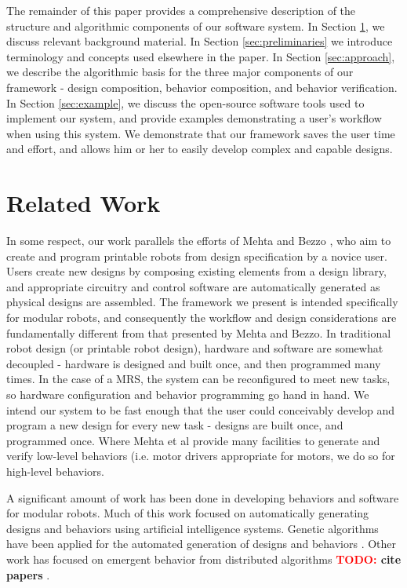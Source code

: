 \documentclass[conference]{IEEEtran}
\theoremstyle{definition}
\newcommand{\TODO}[1]{ {\bf \textcolor{red}{TODO:} #1 }}
\begin{document}
The remainder of this paper provides a comprehensive description of the
structure and algorithmic components of our software system.  In Section \ref{sec:related-work},
we discuss relevant background material.
In Section \ref{sec:preliminaries} we introduce terminology and  concepts used elsewhere in the
paper. 
In Section \ref{sec:approach}, we describe the algorithmic basis
for the three major components of our framework - design composition, behavior
composition, and behavior verification.  In Section
\ref{sec:example}, we discuss the open-source software
tools used to implement our system, and provide examples demonstrating a user's
workflow when using this system.  We demonstrate that our framework saves the
user time and effort, and allows him or her to easily develop complex and
capable designs.


\section{Related Work}
\label{sec:related-work}
In some respect, our work parallels the efforts of Mehta \cite{mehta2014design}
and Bezzo \cite{bezzo2014demo}, who aim to create and program printable robots from
design specification by a novice user.  Users create new designs by composing
existing elements from a design library, and appropriate circuitry and
control software are automatically generated as physical designs are assembled. The framework we present is
intended specifically for modular robots, and consequently the workflow and design considerations are fundamentally different
from that presented by Mehta and Bezzo.  In
traditional robot design (or printable robot design), hardware and software are somewhat
decoupled - hardware is
designed and built once, and then programmed many times.  In the case of a MRS, the system can be reconfigured to meet new tasks,
so hardware configuration and behavior programming go hand in hand.  We intend
our system to be fast enough that the user could conceivably develop and program
a new design for every new task - designs are built once, and programmed once.  Where Mehta et al provide many facilities to generate and verify
low-level behaviors (i.e. motor drivers appropriate for motors, we do so for
high-level behaviors.

A significant amount of work has been done in developing behaviors and software
for modular robots. Much of this work focused on automatically
generating designs and behaviors using artificial intelligence systems. Genetic
algorithms have been applied for the automated generation of designs
and behaviors \cite{hornby2003generative}. Other work has
focused on emergent behavior from distributed algorithms \TODO{cite papers}.
\end{document}
